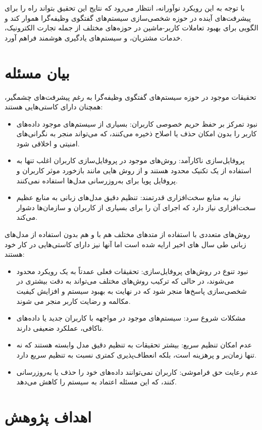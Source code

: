 با توجه به این رویکرد نوآورانه، انتظار می‌رود که نتایج این تحقیق بتواند راه را برای پیشرفت‌های آینده در حوزه شخصی‌سازی سیستم‌های گفتگوی وظیفه‌گرا هموار کند و الگویی برای بهبود تعاملات کاربر-ماشین در حوزه‌های مختلف از جمله تجارت الکترونیک، خدمات مشتریان، و سیستم‌های یادگیری هوشمند فراهم آورد.

\section{بیان مسئله}
تحقیقات موجود در حوزه سیستم‌های گفتگوی وظیفه‌گرا به رغم پیشرفت‌های چشمگیر، همچنان دارای کاستی‌هایی هستند:
\begin{itemize}
\item
نبود تمرکز بر حفظ حریم خصوصی کاربران: بسیاری از سیستم‌های موجود داده‌های کاربر را بدون امکان حذف یا اصلاح ذخیره می‌کنند، که می‌تواند منجر به نگرانی‌های امنیتی و اخلاقی شود.
\item
پروفایل‌سازی ناکارآمد: روش‌های موجود در پروفایل‌سازی کاربران اغلب تنها به استفاده از یک تکنیک محدود هستند و از روش هایی مانند بازخورد موثر کاربران و پروفایل پویا برای به‌روزرسانی مدل‌ها استفاده نمی‌کنند.
\item
نیاز به منابع سخت‌افزاری قدرتمند: تنظیم دقیق مدل‌های زبانی به منابع عظیم سخت‌افزاری نیاز دارد که اجرای آن را برای بسیاری از کاربران و سازمان‌ها دشوار می‌کند.
\end{itemize}

روش‌های متعددی با استفاده از متدهای مختلف هم با و هم بدون استفاده از مدل‌های زبانی طی سال ‌های اخیر ارایه شده است اما آنها نیز دارای کاستی‌هایی در کار خود هستند:
\begin{itemize}
\item
نبود تنوع در روش‌های پروفایل‌سازی: تحقیقات فعلی عمدتاً به یک رویکرد محدود می‌شوند، در حالی که ترکیب روش‌های مختلف می‌تواند به دقت بیشتری در شخصی‌سازی پاسخ‌ها منجر شود که در نهایت به بهبود سیستم و افزایش کیفیت مکالمه و رضایت کاربر منجر می شوند.
\item
مشکلات شروع سرد: سیستم‌های موجود در مواجهه با کاربران جدید یا داده‌های ناکافی، عملکرد ضعیفی دارند.
\item
عدم امکان تنظیم سریع: بیشتر تحقیقات به تنظیم دقیق مدل وابسته هستند که نه تنها زمان‌بر و پرهزینه است، بلکه انعطاف‌پذیری کمتری نسبت به تنظیم سریع دارد.
\item
عدم رعایت حق فراموشی: کاربران نمی‌توانند داده‌های خود را حذف یا به‌روزرسانی کنند، که این مسئله اعتماد به سیستم را کاهش می‌دهد.
\end{itemize}


\section{اهداف پژوهش}

